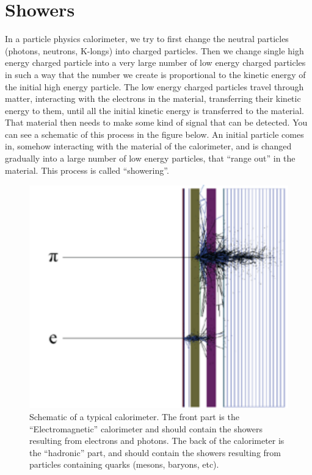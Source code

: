 \;
\;

\section{Showers}

\noindent
In a particle physics calorimeter, we try to first change the neutral particles (photons, neutrons, K-longs) into charged particles. Then we change single high energy charged particle into a very large number of low energy charged particles in such a way that the number we create is proportional to the kinetic energy of the initial high energy particle. The low energy charged particles travel through matter, interacting with the electrons in the material, transferring their kinetic energy to them, until all the initial kinetic energy is transferred to the material. That material then needs to make some kind of signal that can be detected. You can see a schematic of this process in the figure below. An initial particle comes in, somehow interacting with the material of the calorimeter, and is changed gradually into a large number of low energy particles, that ``range out'' in the material. This process is called ``showering''.

\;
\;

\begin{figure}[h]
\centering\includegraphics[scale=1.0]{./calorimetry/Pictures/fig1.pdf}
\caption{Schematic of a typical calorimeter. The front part is the ``Electromagnetic'' calorimeter and should contain the showers resulting from electrons and photons. The back of the calorimeter is the ``hadronic'' part, and should contain the showers resulting from particles containing quarks (mesons, baryons, etc).}
\label{fig:pdgdedx}
\end{figure}

